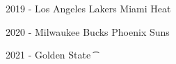 \documentclass[
]{book}
\begin{document}
2019 - Los Angeles Lakers \textbar{} Miami Heat

2020 - Milwaukee Bucks \textbar{} Phoenix Suns

2021 - Golden State \t
\end{document}
